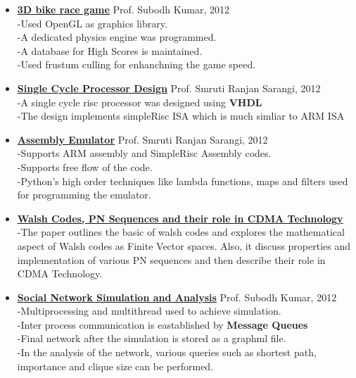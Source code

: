\documentclass[letterpaper,11pt]{article}
\begin{document}
\begin{itemize}

\item {\large \textbf{\href{https://github.com/knsn1994/HitchHiker-s-Rover--GAME-}{3D bike race game} } \hspace{7.2cm} Prof. Subodh Kumar, 2012}\\ 
-Used OpenGL as graphics library. \\
-A dedicated physics engine was programmed. \\
-A database for High Scores is maintained. \\
-Used frustum culling for enhanchning the game speed. \\[5pt]

\item {\large \textbf{\href{https://github.com/knsn1994/processor}{Single Cycle Processor Design} } \hspace{3.5cm} Prof. Smruti Ranjan Sarangi, 2012} \\ 
-A single cycle risc processor was designed using \textbf{VHDL}\\ 
-The design implements simpleRisc ISA which is much simliar to ARM ISA \\[5pt]

\item {\large \textbf{\href{https://github.com/knsn1994/assembly_emulator}{Assembly Emulator} } \hspace{5.6cm} Prof. Smruti Ranjan Sarangi, 2012} \\ 
-Supports ARM assembly and SimpleRisc Assembly codes. \\ 
-Supports free flow of the code. \\
-Python's high order techniques like lambda functions, maps and filters used for programming the emulator. \\[5pt]

\item {\large \textbf{\href{http://www.cse.iitd.ernet.in/~cs1120231/walsh.pdf}{Walsh Codes, PN Sequences and their role in CDMA Technology} } }\\
-The paper outlines the basic of walsh codes and explores the mathematical aspect of Walsh codes as Finite Vector spaces. Also, it discuss properties and implementation of various PN sequences and then describe their role in CDMA Technology. \\[5pt]

\item {\large \textbf{\href{https://github.com/knsn1994/SocialNetworkSimulator}{Social Network Simulation and Analysis}} \hspace{3cm} Prof. Subodh Kumar, 2012}\\ 
-Multiprocessing and multithread used to achieve simulation. \\ 
-Inter process communication is eastablished by {\bf Message Queues}\\
-Final network after the simulation is stored as a graphml file. \\
-In the analysis of  the network, various queries such as shortest path, importance and clique size can be performed.\\[-5pt]
\end{itemize}
\end{document}
